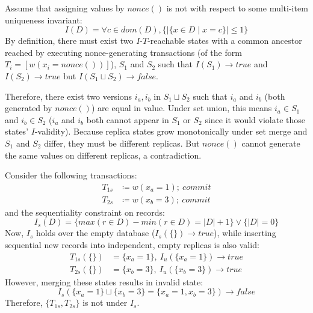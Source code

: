 \begin{claim}
\label{claim:nunique}

Assume that assigning values by $nonce()$ is not \iconfluent with respect to some multi-item uniqueness invariant:
$$I(D) = \forall c \in dom(D), \{|\{x \in D \mid x = c\}| \leq 1 \}$$
By definition, there must exist two $I$-$T$-reachable states with a common ancestor reached by executing nonce-generating transactions (of the form $T_i=[w(x_i = nonce())]$), $S_1$ and $S_2$ such that $I(S_1) \rightarrow true$ and $I(S_2) \rightarrow true$ but $I(S_1 \sqcup S_2) \rightarrow false$.

Therefore, there exist two versions $i_a, i_b$ in $S_1 \sqcup S_2$ such that $i_a$ and $i_b$ (both generated by $nonce()$) are equal in value. Under set union, this means $i_a \in S_1$ and $i_b \in S_2$ ($i_a$ and $i_b$ both cannot appear in $S_1$ or $S_2$ since it would violate those states' $I$-validity). Because replica states grow monotonically under set merge and $S_1$ and $S_2$ differ, they must be different replicas. But $nonce()$ cannot generate the same values on different replicas, a contradiction. \end{claim}

\begin{claim}
\label{claim:nseq-insert}
Consider the following transactions:
\begin{align*}
T_{1s}&\coloneqq w(x_a=1);~commit\\
T_{2s}&\coloneqq w(x_b=3);~commit
\end{align*}
and the sequentiality constraint on records:
$$I_s(D) =\{max(r\in D)-min(r\in D) = |D|+1\} \vee \{|D|=0\}$$
Now, $I_s$ holds over the empty database ($I_s(\{\}) \rightarrow true$), while inserting sequential new records into independent, empty replicas is also valid:
\begin{align*}
T_{1s}(\{\})&=\{x_a=1\},~I_u(\{x_a=1\}) \rightarrow true\\
T_{2s}(\{\})&=\{x_b=3\},~I_u(\{x_b=3\}) \rightarrow true
\end{align*}
However, merging these states results in invalid state:
$$I_s(\{x_a=1\}\sqcup \{x_b=3\} = \{x_a=1, x_b=3\}) \rightarrow false$$
Therefore, $\{T_{1s}, T_{2s}\}$ is not \iconfluent under $I_s$.
\end{claim}

